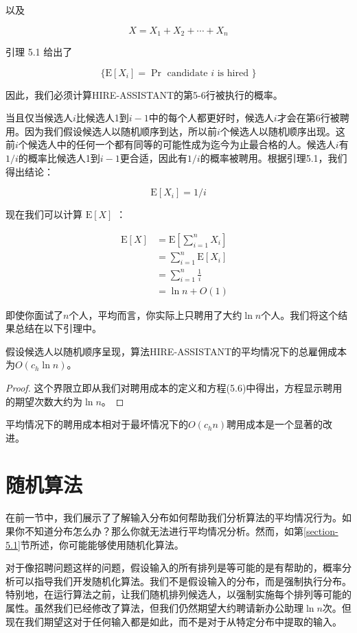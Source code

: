 \documentclass[lang=cn,newtx,10pt,scheme=chinese]{elegantbook}
\begin{document}
以及

$$
X=X_1+X_2+\cdots+X_n
$$

引理 5.1 给出了

$$
\{\mathrm{E}[X_i]=\operatorname{Pr} \text { candidate } i \text { is hired }\}
$$

因此，我们必须计算HIRE-ASSISTANT的第5-6行被执行的概率。

当且仅当候选人$i$比候选人1到$i-1$中的每个人都更好时，候选人$i$才会在第6行被聘用。因为我们假设候选人以随机顺序到达，所以前$i$个候选人以随机顺序出现。这前$i$个候选人中的任何一个都有同等的可能性成为迄今为止最合格的人。候选人$i$有$1/i$的概率比候选人1到$i-1$更合适，因此有$1/i$的概率被聘用。根据引理5.1，我们得出结论：

$$
\mathrm{E}[X_i]=1 / i
$$

现在我们可以计算 $\mathrm{E}[X]$ ：

$$
\begin{array}{rlr}
\mathrm{E}[X] & =\mathrm{E}[\sum_{i=1}^n X_i] &  \\
& =\sum_{i=1}^n \mathrm{E}[X_i] &  \\
& =\sum_{i=1}^n \frac{1}{i} &  \\
& =\ln n+O(1) & 
\end{array}
$$

即使你面试了$n$个人，平均而言，你实际上只聘用了大约$\ln n$个人。我们将这个结果总结在以下引理中。

\begin{lemma}{}{}
假设候选人以随机顺序呈现，算法HIRE-ASSISTANT的平均情况下的总雇佣成本为$O(c_h \ln n)$。
\end{lemma}

\begin{proof}
这个界限立即从我们对聘用成本的定义和方程(5.6)中得出，方程显示聘用的期望次数大约为$\ln n$。
\end{proof}

平均情况下的聘用成本相对于最坏情况下的$O(c_h n)$聘用成本是一个显著的改进。

\section{随机算法}\label{section-5.3}

在前一节中，我们展示了了解输入分布如何帮助我们分析算法的平均情况行为。如果你不知道分布怎么办？那么你就无法进行平均情况分析。然而，如第\ref{section-5.1}节所述，你可能能够使用随机化算法。

对于像招聘问题这样的问题，假设输入的所有排列是等可能的是有帮助的，概率分析可以指导我们开发随机化算法。我们不是假设输入的分布，而是强制执行分布。特别地，在运行算法之前，让我们随机排列候选人，以强制实施每个排列等可能的属性。虽然我们已经修改了算法，但我们仍然期望大约聘请新办公助理$\ln n$次。但现在我们期望这对于任何输入都是如此，而不是对于从特定分布中提取的输入。
\end{document}
